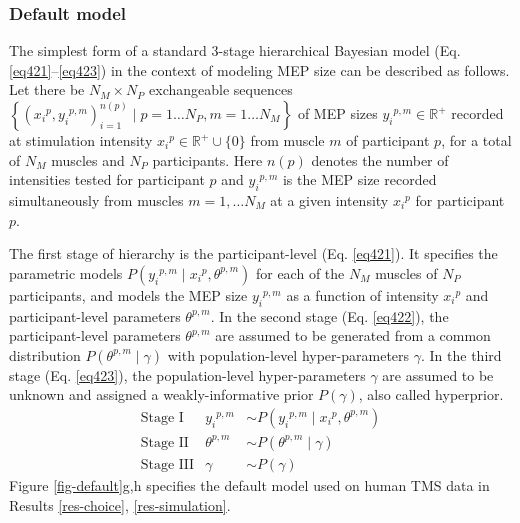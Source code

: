 \documentclass[sn-mathphys-ay]{sn-jnl}%
\theoremstyle{thmstyleone}%
\theoremstyle{thmstyletwo}%
\theoremstyle{thmstylethree}%
\begin{document}
\subsubsection{Default model}\label{meth-default}
The simplest form of a standard 3-stage hierarchical Bayesian model (Eq. \ref{eq421}--\ref{eq423}) in the context of modeling MEP size can be described as follows. Let there be $N_M \times N_P$ exchangeable sequences $\left\{\left({x_i}^{p}, {y_i}^{p,m}\right)_{i=1}^{n(p)} \mid p = 1\ldots N_P, m = 1\ldots N_M\right\}$ of MEP sizes ${y_i}^{p,m} \in \mathbb{R}^+$ recorded at stimulation intensity ${x_i}^p \in \mathbb{R}^+\cup\{0\}$ from muscle $m$ of participant $p$, for  a total of $N_M$ muscles and $N_P$ participants. Here $n(p)$ denotes the number of intensities tested for participant $p$ and ${y_i}^{p,m}$ is the MEP size recorded simultaneously from muscles $m=1,\ldots N_M$ at a given intensity ${x_i}^p$ for participant $p$.

The first stage of hierarchy is the participant-level (Eq. \ref{eq421}). It specifies the parametric models $P\left({y_i}^{p,m} \mid {x_i}^p, \theta^{p,m}\right)$ for each of the $N_M$ muscles of $N_P$ participants, and models the MEP size ${y_i}^{p,m}$ as a function of intensity ${x_i}^p$ and participant-level parameters $\theta^{p,m}$. In the second stage (Eq. \ref{eq422}), the participant-level parameters $\theta^{p,m}$ are assumed to be generated from a common distribution $P\left(\theta^{p,m} \mid \gamma\right)$ with population-level hyper-parameters $\gamma$. In the third stage (Eq. \ref{eq423}), the population-level hyper-parameters $\gamma$ are assumed to be unknown and assigned a weakly-informative prior $P\left(\gamma\right)$, also called hyperprior.
\begin{align}
    &\text{Stage I} &{y_i}^{p,m} &\sim P\left({y_i}^{p,m} \mid {x_i}^p, \theta^{p,m}\right)& \label{eq421}\\
    &\text{Stage II} &\theta^{p,m} &\sim P\left(\theta^{p,m} \mid \gamma\right)& \label{eq422}\\
    &\text{Stage III} &\gamma &\sim P\left(\gamma\right)& \label{eq423}
\end{align}
Figure \ref{fig-default}g,h specifies the default model used on human TMS data in Results \ref{res-choice}, \ref{res-simulation}.
\end{document}

